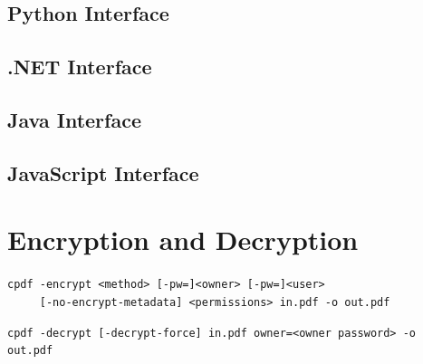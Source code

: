 \documentclass{book}
\begin{document}
\begin{pycpdflib}
\clearpage
\section*{Python Interface}
\begin{small}\tt

\end{small}
\end{pycpdflib}

\begin{dotnetcpdflib}
\clearpage
\section*{.NET Interface}
\begin{small}\tt

\end{small}
\end{dotnetcpdflib}

\begin{jcpdflib}
\clearpage
\section*{Java Interface}
\begin{small}\tt

\end{small}
\end{jcpdflib}

\begin{jscpdflib}
\clearpage
\section*{JavaScript Interface}
\begin{small}\tt

\end{small}
\end{jscpdflib}

\chapter{Encryption and Decryption}\label{chap:4}
\pagestyle{fancy}
\label{encryption}
  \begin{framed}
    \small\noindent\verb!cpdf -encrypt <method> [-pw=]<owner> [-pw=]<user>!\\
    \noindent\verb!     [-no-encrypt-metadata] <permissions> in.pdf -o out.pdf!

    \vspace{1.5mm}
    \noindent\verb!cpdf -decrypt [-decrypt-force] in.pdf owner=<owner password> -o out.pdf!
  \end{framed}
  \label{crypt}
\end{document}
